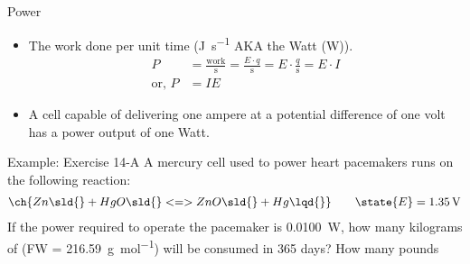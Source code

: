 \documentclass[notes=only]{beamer}
\begin{document}

\begin{frame}{Power}
	\begin{itemize}
		\item The work done per unit time (\si{\joule\per\second} AKA
			the Watt (\si{\watt})).
			\begin{align*}
				P &= \frac{\text{work}}{\si{\second}} = \frac{E
				\cdot q}{\si{\second}} = E \cdot
				\frac{q}{\si{\second}} = E \cdot I \\
				\text{or,~} P &= IE
			\end{align*}
		\item A cell capable of delivering one ampere at a potential
			difference of one volt has a power output of one Watt.
	\end{itemize}
\end{frame}


\begin{frame}[t]{Example: Exercise 14-A}
	A mercury cell used to power heart pacemakers runs on the following
	reaction:
	\begin{align*}
		\ch{Zn\sld{} + HgO\sld{} <=> ZnO\sld{} + Hg\lqd{}} \qquad
		\state{E} = \SI{1.35}{\volt}
	\end{align*}
	If the power required to operate the pacemaker is \SI{0.0100}{\watt},
	how many kilograms of  (FW = \SI{216.59}{\gram\per\mole}) will
	be consumed in 365 days? How many pounds 
\end{frame}

\end{document}
